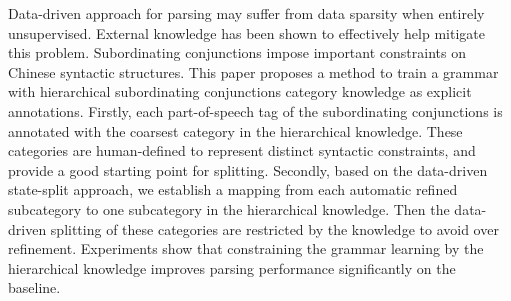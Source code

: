 Data-driven approach for parsing may suffer from data sparsity when entirely unsupervised. External knowledge has been shown to effectively help mitigate this problem. Subordinating conjunctions impose important constraints on Chinese syntactic structures. This paper proposes a method to train a grammar with hierarchical subordinating conjunctions category knowledge as explicit annotations. Firstly, each part-of-speech tag of the subordinating conjunctions is annotated with the coarsest category in the hierarchical knowledge. These categories are human-defined to represent distinct syntactic constraints, and provide a good starting point for splitting. Secondly, based on the data-driven state-split approach, we establish a mapping from each automatic refined subcategory to one subcategory in the hierarchical knowledge. Then the data-driven splitting of these categories are restricted by the knowledge to avoid over refinement. Experiments show that constraining the grammar learning by the hierarchical knowledge improves parsing performance significantly on the baseline.
